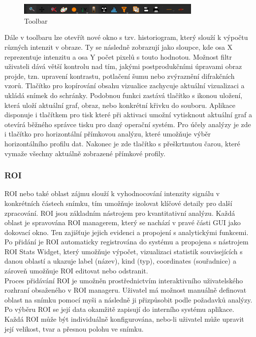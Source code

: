 \documentclass[a4paper,11pt]{article}
\begin{document}
\begin{figure}[H]
	\centering
	\includegraphics[width=0.8\textwidth]{images/Toolbar.png}
	\caption{Toolbar}
\end{figure}

Dále v toolbaru lze otevřít nové okno s tzv. historiogram, který slouží k výpočtu různých intenzit v obraze. Ty se následně zobrazují jako sloupce, kde osa X reprezentuje intenzitu a osa Y počet pixelů s touto hodnotou. Možnost filtr uživateli dává větší kontrolu nad tím, jakými postprodukčními úpravami obraz projde, tzn. upravení kontrastu, potlačení šumu nebo zvýraznění difrakčních vzorů. Tlačítko pro kopírování obsahu vizualice zachycuje aktuální vizualizaci a ukládá snímek do schránky. Podobnou funkci zastává tlačítko s ikonou uložení, která uloží aktuální graf, obraz, nebo konkrétní křivku do souboru. Aplikace disponuje i tlačítkem pro tisk které při aktivaci umožní vytisknout aktuální graf a otevírá běžného správce tisku pro daný operační systém. Pro účely analýzy je zde i tlačítko pro horizontální přímkovou analýzu, které umožňuje výběr horizontálního profilu dat. Nakonec je zde tlačítko s přeškrtnutou čarou, které vymaže všechny aktuálně zobrazené přímkové profily.


\subsubsection{ROI}
ROI nebo také oblast zájmu slouží k vyhodnocování intenzity signálu v konkrétních částech snímku, tím umožňuje izolovat klíčové detaily pro další zpracování. ROI jsou základním nástrojem pro kvantitativní analýzu. Každá oblast je spravována ROI managerem, který se nachází v pravé části GUI jako dokovací okno. Ten zajišťuje jejich evidenci a propojení s analytickými funkcemi. Po přidání je ROI automaticky registrována do systému a propojena s nástrojem ROI Stats Widget, který umožňuje výpočet, vizualizaci statistik souvisejících s danou oblastí a ukazuje label (název), kind (typ), coordinates (souřadnice) a zároveň umožňuje ROI editovat nebo odstranit.\\

Proces přidávání ROI je umožněn prostřednictvím interaktivního uživatelského rozhraní obsaženého v ROI manageru. Uživatel má možnost manuálně definovat oblast na snímku pomocí myši a následně ji přizpůsobit podle požadavků analýzy. Po výběru ROI se její data okamžitě zapisují do interního systému aplikace. Každá ROI může být individuálně konfigurována, nebo-li uživatel může upravit její velikost, tvar a přesnou polohu ve snímku.\\
\newpage
\end{document}
